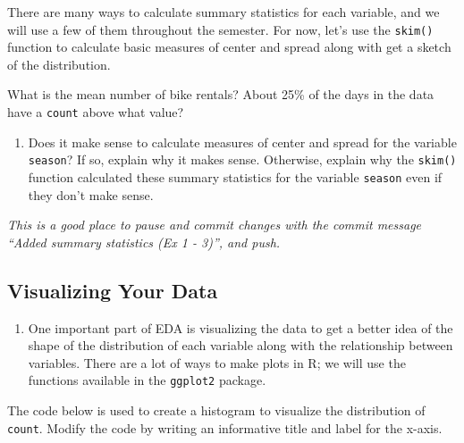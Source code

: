 \documentclass[]{book}
\newenvironment{Shaded}{\begin{snugshade}}{\end{snugshade}}
\newcommand{\KeywordTok}[1]{\textcolor[rgb]{0.13,0.29,0.53}{\textbf{#1}}}
\newcommand{\StringTok}[1]{\textcolor[rgb]{0.31,0.60,0.02}{#1}}
\newcommand{\OperatorTok}[1]{\textcolor[rgb]{0.81,0.36,0.00}{\textbf{#1}}}
\newcommand{\NormalTok}[1]{#1}
\providecommand{\tightlist}{%
  \setlength{\itemsep}{0pt}\setlength{\parskip}{0pt}}
\begin{document}
There are many ways to calculate summary statistics for each variable,
and we will use a few of them throughout the semester. For now, let's
use the \texttt{skim()} function to calculate basic measures of center
and spread along with get a sketch of the distribution.

\begin{Shaded}
\end{Shaded}

What is the mean number of bike rentals? About 25\% of the days in the
data have a \texttt{count} above what value?

\begin{enumerate}
\def\labelenumi{\arabic{enumi}.}
\setcounter{enumi}{2}
\tightlist
\item
  Does it make sense to calculate measures of center and spread for the
  variable \texttt{season}? If so, explain why it makes sense.
  Otherwise, explain why the \texttt{skim()} function calculated these
  summary statistics for the variable \texttt{season} even if they don't
  make sense.
\end{enumerate}

\emph{This is a good place to pause and commit changes with the commit
message ``Added summary statistics (Ex 1 - 3)'', and push.}

\subsection{Visualizing Your Data}\label{visualizing-your-data}

\begin{enumerate}
\def\labelenumi{\arabic{enumi}.}
\setcounter{enumi}{3}
\tightlist
\item
  One important part of EDA is visualizing the data to get a better idea
  of the shape of the distribution of each variable along with the
  relationship between variables. There are a lot of ways to make plots
  in R; we will use the functions available in the \texttt{ggplot2}
  package.
\end{enumerate}

The code below is used to create a histogram to visualize the
distribution of \texttt{count}. Modify the code by writing an
informative title and label for the x-axis.
\end{document}
